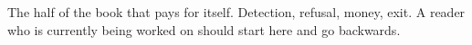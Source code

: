 
\begin{partblurb}
The half of the book that pays for itself. Detection, refusal, money, exit. A reader who is currently being worked on should start here and go backwards.
\end{partblurb}
